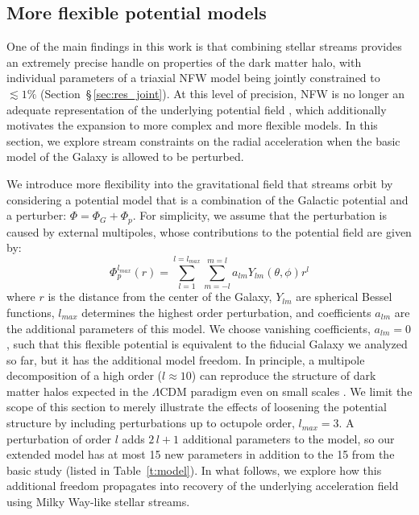 \documentclass[modern]{aastex62}
\begin{document}
\subsection{More flexible potential models}
\label{sec:bfe}
One of the main findings in this work is that combining stellar streams provides an extremely precise handle on properties of the dark matter halo, with individual parameters of a triaxial NFW model being jointly constrained to $\lesssim1\%$ (Section~\S\,\ref{sec:res_joint}).
At this level of precision, NFW is no longer an adequate representation of the underlying potential field \citep[e.g.,][]{bonaca2014}, which additionally motivates the expansion to more complex and more flexible models.
In this section, we explore stream constraints on the radial acceleration when the basic model of the Galaxy is allowed to be perturbed.

We introduce more flexibility into the gravitational field that streams orbit by considering a potential model that is a combination of the Galactic potential and a perturber: $\Phi = \Phi_{G} + \Phi_{p}$. 
For simplicity, we assume that the perturbation is caused by external multipoles, whose contributions to the potential field are given by:
\begin{equation}
\Phi_{p}^{l_{max}}(r) = \sum_{l=1}^{l=l_{max}}\sum_{m=-l}^{m=l} a_{lm} Y_{lm}(\theta,\phi) r^l
\label{eq:multipoles}
\end{equation}
where $r$ is the distance from the center of the Galaxy, $Y_{lm}$ are spherical Bessel functions, $l_{max}$ determines the highest order perturbation, and coefficients $a_{lm}$ are the additional parameters of this model.
We choose vanishing coefficients, $a_{lm}=0$, such that this flexible potential is equivalent to the fiducial Galaxy we analyzed so far, but it has the additional model freedom.
In principle, a multipole decomposition of a high order ($l\approx 10$) can reproduce the structure of dark matter halos expected in the $\Lambda$CDM paradigm even on small scales \citep{lowing2011}.
We limit the scope of this section to merely illustrate the effects of loosening the potential structure by including perturbations up to octupole order, $l_{max}=3$.
A perturbation of order $l$ adds $2\,l+1$ additional parameters to the model, so our extended model has at most 15 new parameters in addition to the 15 from the basic study (listed in Table~\ref{t:model}).
In what follows, we explore how this additional freedom propagates into recovery of the underlying acceleration field using Milky Way-like stellar streams.
\end{document}
